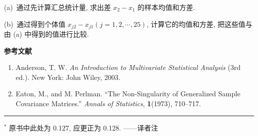 (a)\ 通过先计算汇总统计量, 求出差 $x_2-x_1$ 的样本均值和方差.

(b)\ 通过得到个体值 $x_{j2}-x_{j1}(j=1,2,\cdots,25)$, 计算它的均值和方差, 把这些值与由 (a) 中得到的值进行比较.

\vspace{6pt}
\label{bib:3}
{\large\bfseries 参考文献}

\medskip
\begin{enumerate}
\item Anderson, T. W. \textit{An Introduction to Multivariate Statistical Analysis} (3rd ed.). New York: John Wiley, 2003.
\item Eaton, M., and M. Perlman. ``The Non-Singularity of Generalized Sample Covariance Matrices.'' \textit{Annals of Statistics}, \textbf{1}(1973), 710--717.
\end{enumerate}

\vspace{2em}
\noindent\rule{\linewidth}{0.4pt}

{\footnotesize $^*$ 原书中此处为 0.127, 应更正为 0.128. ——译者注}
